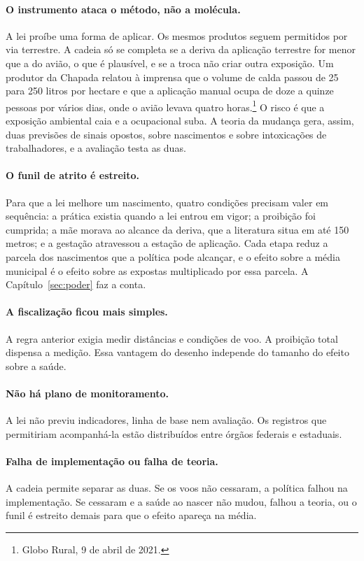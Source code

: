 \paragraph{O instrumento ataca o método, não a molécula.} A lei proíbe uma forma
de aplicar. Os mesmos produtos seguem permitidos por via terrestre. A cadeia só
se completa se a deriva da aplicação terrestre for menor que a do avião, o que
é plausível, e se a troca não criar outra exposição. Um produtor da Chapada
relatou à imprensa que o volume de calda passou de 25 para 250 litros por
hectare e que a aplicação manual ocupa de doze a quinze pessoas por vários
dias, onde o avião levava quatro horas.\footnote{Globo Rural, 9 de abril de
2021.} O
risco é que a exposição ambiental caia e a ocupacional suba. A teoria da mudança
gera, assim, duas previsões de sinais opostos, sobre nascimentos e sobre
intoxicações de trabalhadores, e a avaliação testa as duas.

\paragraph{O funil de atrito é estreito.} Para que a lei melhore um nascimento,
quatro condições precisam valer em sequência: a prática existia quando a lei
entrou em vigor; a proibição foi cumprida; a mãe morava ao alcance da deriva,
que a literatura situa em até 150 metros; e a gestação atravessou a estação de
aplicação. Cada etapa reduz a parcela dos nascimentos que a política pode
alcançar, e o efeito sobre a média municipal é o efeito sobre as expostas
multiplicado por essa parcela. A Capítulo~\ref{sec:poder} faz a conta.

\paragraph{A fiscalização ficou mais simples.} A regra anterior exigia medir
distâncias e condições de voo. A proibição total dispensa a medição. Essa
vantagem do desenho independe do tamanho do efeito sobre a saúde.

\paragraph{Não há plano de monitoramento.} A lei não previu indicadores, linha
de base nem avaliação. Os registros que permitiriam acompanhá-la estão
distribuídos entre órgãos federais e estaduais.

\paragraph{Falha de implementação ou falha de teoria.} A cadeia permite
separar as duas. Se os voos não cessaram, a política falhou na implementação.
Se cessaram e a saúde ao nascer não mudou, falhou a teoria, ou o funil é
estreito demais para que o efeito apareça na média.

